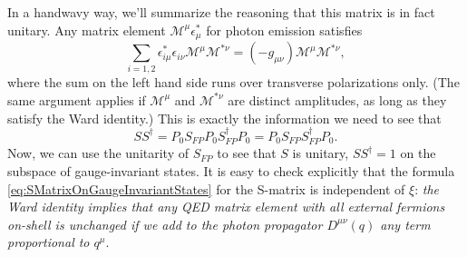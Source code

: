 In a handwavy way, we'll summarize the reasoning that this matrix
is in fact unitary. Any matrix element
$\mathcal{M}^{\mu}\epsilon^{*}_{\mu}$ for photon emission
satisfies
\begin{equation}%
\sum_{i=1,2}\epsilon^{*}_{i\mu}\epsilon_{i\nu}\mathcal{M}^{\mu}\mathcal{M}^{*\nu}=(-g_{\mu\nu})\mathcal{M}^{\mu}\mathcal{M}^{*\nu},
\end{equation}
where the sum on the left hand side runs over transverse
polarizations only. (The same argument applies if
$\mathcal{M}^{\mu}$ and $\mathcal{M}^{*\nu}$ are distinct
amplitudes, as long as they satisfy the Ward identity.) This is
exactly the information we need to see that
\begin{equation}%
SS^{\dag}=P_{0}S_{FP}P_{0}S_{FP}^{\dag}P_{0}=P_{0}S_{FP}S_{FP}^{\dag}P_{0}.
\end{equation}
Now, we can use the unitarity of $S_{FP}$ to see that $S$ is
unitary, $SS^{\dag}=1$ on the subspace of gauge-invariant
states. It is easy to check explicitly that the formula \eqref{eq:SMatrixOnGaugeInvariantStates}
for the S-matrix is independent of $\xi$: \emph{the Ward identity
implies that any QED matrix element with all external fermions
on-shell is unchanged if we add to the photon propagator
$D^{\mu\nu}(q)$ any term proportional to $q^{\mu}$}.




